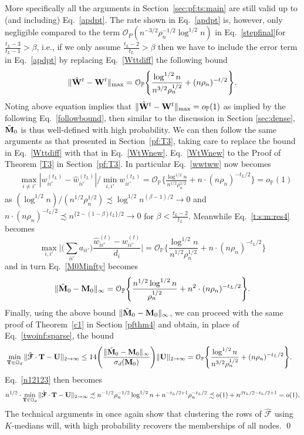\documentclass[10pt,journal,compsoc]{IEEEtran}
\newcommand{\op}{\mathcal{O}_{\mathbb{P}}}
\newcommand{\ee}{\end{aligned} \end{equation}}
\newcommand{\bds}{\boldsymbol}
\newcommand{\twoinf}{2\rightarrow \infty}
\newcommand{\bee}{\begin{equation}\begin{aligned}}
\newcommand{\M}[1]{{{\mathbf{\MakeUppercase{#1}}}}}
\numberwithin{equation}{section}
\begin{document}
More specifically all the arguments in Section~\ref{sec:pf:ts:main} are still valid up to (and including) Eq.~\eqref{apdpt}.
The rate shown in Eq.~\eqref{apdpt} is, however, only negligible compared to the term $\mathcal{O}_{P}(n^{-3/2} \rho_n^{-1/2} \log^{1/2}{n})$ in Eq.~\eqref{stepfinal}for $\frac{t_L - 3}{t_L - 1} > \beta$, i.e., if we only assume $\frac{t_L - 2}{t_L} > \beta$ then we have to include the error term in Eq.~\eqref{apdpt} by replacing Eq.~\eqref{Wttdiff} the following bound
\bee\label{WtWnew}
\|\hat{\M W}^{t} - \M W^{t}\|_{\max} =
\op\Bigg\{\frac{\log^{1/2}{n}}{n^{3/2} \rho_n^{1/2}} + (n\rho_n)^{-t/2}\Bigg\}.
\ee
Noting above equation implies that $\|\hat{\M W}^t - \M W^t\|_{\max}=o_{\mathbb{P}}(1)$ as implied by the following Eq.~\eqref{followbound}, then similar to the discussion in Section \ref{sec:dense}, $\tilde{\M M}_0$ is thus well-defined with high probability. We can then follow the same arguments as that presented in
Section~\ref{pf:T3}, taking care to replace the bound in Eq.~\eqref{Wttdiff} with that in Eq.~\eqref{WtWnew}. 
Eq.~\eqref{WtWnew} to the Proof of Theorem \ref{T3} in Section~\ref{pf:T3}. In particular Eq.~\eqref{wwtww} now becomes
\bee\label{followbound}
&\max_{i \neq {i'}}|w^{(t_L)}_{ii'} - \hat{w}^{(t_L)}_{ii'}|/\min_{i,i'}w^{(t_L)}_{ii'}
=
\op\Bigg\{\frac{\log^{1/2}{n}}{n^{1/2} \rho_n^{1/2}} + n\cdot(n\rho_n)^{-t_L/2}\Bigg\}
= o_{\mathbb{P}}(1)
\ee
as     
$(\log^{1/2}{n})/(n^{1/2} \rho_n^{1/2}) \precsim \log^{1/2} n^{(\beta - 1)/2}\rightarrow 0$ 
and $n\cdot(n\rho_n)^{-t_L/2} \precsim n^{\{2 - (1 - \beta)t_L\}/2} \rightarrow 0$ for $\beta < \frac{t_L - 2}{t_L}$. 
Meanwhile Eq.~\eqref{t:s:m:res4} becomes
$$
\max_{i,{i'}}\Big|\Big(\sum_{ii'}a_{ii'}\Big)\frac{\hat{w}_{ii'}^{(t)}
  - w_{ii'}^{(t)}}{d_i}\Big| =\op\Bigg\{\frac{\log^{1/2}{n}}{n^{1/2} \rho_n^{1/2}} + n\cdot(n\rho_n)^{-t_L/2}\Bigg\}
$$
and in turn Eq.~\eqref{M0Minfty} becomes
$$
\|\tilde{\M M}_0-\M M_0\|_{\infty}=\op\Bigg\{\frac{n^{1/2}\log^{1/2}{n}}{ \rho_n^{1/2}} + n^2\cdot(n\rho_n)^{-t_L/2}\Bigg\}.
$$
Finally, using the above bound $\|\tilde{\M M}_0-\M M_0\|_{\infty}$, we can proceed with the same proof of Theorem~\ref{c1} in Section \ref{pfthm4} and obtain, in place of Eq.~\eqref{twoinf:sparse}, the bound
\bee
\label{eq:hat_F_alternative}
 &\min_{\M T \in \mathbb{O}_{d}} \|\hat{\bds{\mathcal{F}}} \cdot \mathbf{T} - \mathbf{U}\|_{\twoinf} 
\leq 14\Bigg(\frac{\|\tilde{\M M}_0 - \M M_0\|_{\infty}}{\sigma_d(\M M_0)}\Bigg)\|\M U\|_{\twoinf}
=\op\Bigg\{\frac{\log^{1/2}{n}}{ n^{3/2}\rho_n^{1/2}} + (n\rho_n)^{-t_L/2}\Bigg\}.
\ee
Eq.~\eqref{n12123} then becomes
\bee
n^{1/2}\cdot \min_{\M T \in \mathbb{O}_{d}} \|\hat{\bds{\mathcal{F}}} \cdot \mathbf{T} - \mathbf{U}\|_{\twoinf} 
\precsim  n^{-1/2}\rho_n^{-1/2}\log^{1/2}n + n^{-t_L/2 + 1}\rho_n^{-{t_L/2}}
\precsim  o(1) + n^{\beta t_L/2 - t_L/2 + 1}
 = o(1),
\ee
The technical arguments in \cite{lei2019unified} once again show that clustering the rows of $\hat{\bds{\mathcal{F}}}$ using $K$-medians will, with high probability recovers the memberships of all nodes.
\qed
\end{document}
